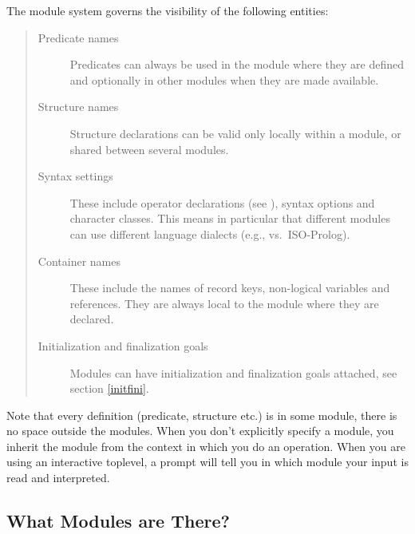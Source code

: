 The {\eclipse} module system governs the visibility of the following
entities:
\begin{quote}
\begin{description}
\item[Predicate names]
    Predicates can always be used in the module where they are defined
    and optionally in other modules when they are made available.
\item[Structure names]
    Structure declarations can be valid only locally within a module, or
    shared between several modules.
\item[Syntax settings]
    These include operator declarations (see
    ),
    syntax options and
    character classes.
    This means in particular that different modules can use different
    language dialects (e.g., {\eclipse} vs.\ ISO-Prolog).
\item[Container names]
    These include the names of record keys, non-logical variables and
    references.
    They are always local to the module where they are declared.
\item[Initialization and finalization goals]
    Modules can have initialization and finalization goals attached,
    see section \ref{initfini}.
\end{description}
\end{quote}

Note that every definition (predicate, structure etc.) is in some module,
there is no space outside the modules. When you don't explicitly
specify a module, you inherit the module from the context in which
you do an operation. When you are using an interactive {\eclipse}
toplevel, a prompt will tell you in which module your input is
read and interpreted.

\subsection{What Modules are There?}

